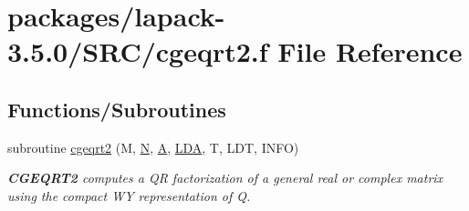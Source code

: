 \hypertarget{cgeqrt2_8f}{}\section{packages/lapack-\/3.5.0/\+S\+R\+C/cgeqrt2.f File Reference}
\label{cgeqrt2_8f}
\subsection*{Functions/\+Subroutines}
\begin{DoxyCompactItemize}
\item 
subroutine \hyperlink{group__complexGEcomputational_gad4ad3f605b1a33a24e9f4adc82fc0d51}{cgeqrt2} (M, \hyperlink{polmisc_8c_a0240ac851181b84ac374872dc5434ee4}{N}, \hyperlink{classA}{A}, \hyperlink{example__user_8c_ae946da542ce0db94dced19b2ecefd1aa}{L\+D\+A}, T, L\+D\+T, I\+N\+F\+O)
\begin{DoxyCompactList}\small\item\em {\bfseries C\+G\+E\+Q\+R\+T2} computes a Q\+R factorization of a general real or complex matrix using the compact W\+Y representation of Q. \end{DoxyCompactList}\end{DoxyCompactItemize}
